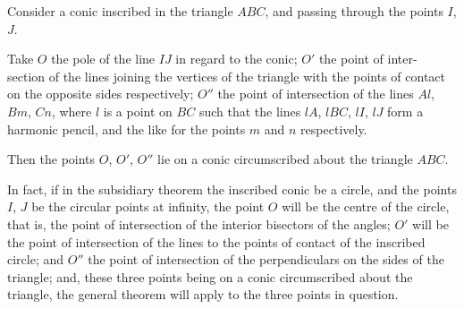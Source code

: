 \documentclass[11pt,a4paper]{article}
\begin{document}
Consider a conic inscribed in the triangle $ABC$, and
passing through the points $I$, $J$.

Take $O$ the pole of the line $IJ$ in regard to the conic; $O'$ the point of inter-
section of the lines joining the vertices of the triangle with the points of contact on
the opposite sides respectively; $O''$ the point of intersection of the lines $Al$, $Bm$, $Cn$,
where $l$ is a point on $BC$ such that the lines $lA$, $lBC$, $lI$, $lJ$ form a harmonic pencil,
and the like for the points $m$ and $n$ respectively.


Then the points $O$, $O'$, $O''$ lie on a conic circumscribed about the triangle $ABC$.

In fact, if in the subsidiary theorem the inscribed conic be a circle, and the
points $I$, $J$ be the circular points at infinity, the point $O$ will be the centre of the
circle, that is, the point of intersection of the interior bisectors of the angles; $O'$ will
be the point of intersection of the lines to the points of contact of the inscribed
circle; and $O''$ the point of intersection of the perpendiculars on the sides of the
triangle; and, these three points being on a conic circumscribed about the triangle,
the general theorem will apply to the three points in question.
\end{document}
